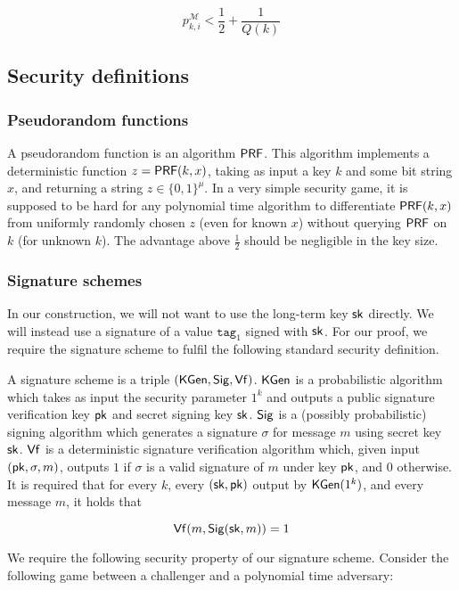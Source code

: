 \documentclass[12pt]{article}
\begin{document}
$$
p_{k,i}^{\mathcal M}<\frac{1}{2}+\frac{1}{Q(k)}
$$

\subsection{Security definitions} \label{sec:def}

\subsubsection*{Pseudorandom functions} \label{PRFdef}
A pseudorandom function is an algorithm $\mathsf{PRF}$. This algorithm implements a deterministic function $z=\mathsf{PRF}(k, x)$, taking as input a key $k$ and some bit string $x$, and returning a string $z \in \{0, 1 \}^{\mu}$. In a very simple security game, it is supposed to be hard for any polynomial time algorithm to differentiate $\mathsf{PRF}(k, x)$ from uniformly randomly chosen $z$ (even for known $x$) without querying $\mathsf{PRF}$ on $k$ (for unknown $k$). The advantage above $\frac{1}{2}$ should be negligible in the key size.

\subsubsection*{Signature schemes}
In our construction, we will not want to use the long-term key $\mathsf{sk}$ directly. We will instead use a signature of a value $\texttt{tag}_1$ signed with $\mathsf{sk}$. For our proof, we require the signature scheme to fulfil the following standard security definition.

A signature scheme is a triple $(\mathsf{KGen}, \mathsf{Sig}, \mathsf{Vf})$. $\mathsf{KGen}$ is a probabilistic algorithm which takes as input the security parameter $1^k$ and outputs a public signature verification key $\mathsf{pk}$ and secret signing key $\mathsf{sk}$. $\mathsf{Sig}$ is a (possibly probabilistic) signing algorithm which generates a signature $\sigma$ for message $m$ using secret key $\mathsf{sk}$. $\mathsf{Vf}$ is a deterministic signature verification algorithm which, given input $(\mathsf{pk}, \sigma, m)$, outputs $1$ if $\sigma$ is a valid signature of $m$ under key $\mathsf{pk}$, and $0$ otherwise. It is required that for every $k$, every $(\mathsf{sk}, \mathsf{pk})$ output by $\mathsf{KGen} (1^k)$, and every message $m$, it holds that

$$\mathsf{Vf} (m , \mathsf{Sig} ({\mathsf{sk}, m})) = 1$$

We require the following security property of our signature scheme. Consider the following game between a challenger and a polynomial time adversary:
\end{document}
